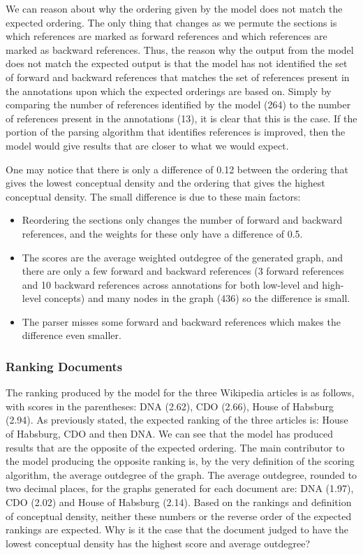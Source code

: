 \documentclass[12pt]{article}
\theoremstyle{grammarstyle}
\begin{document}
We can reason about why the ordering given by the model does not match the expected ordering.
The only thing that changes as we permute the sections is which references are marked as forward references and which references are marked as backward references.
Thus, the reason why the output from the model does not match the expected output is that the model has not identified the set of forward and backward references that matches the set of references present in the annotations upon which the expected orderings are based on.
Simply by comparing the number of references identified by the model (264) to the number of references present in the annotations (13), it is clear that this is the case.
If the portion of the parsing algorithm that identifies references is improved, then the model would give results that are closer to what we would expect.

One may notice that there is only a difference of 0.12 between the ordering that gives the lowest conceptual density and the ordering that gives the highest conceptual density.
The small difference is due to these main factors:
\begin{itemize}
    \item Reordering the sections only changes the number of forward and backward references, and the weights for these only have a difference of 0.5.
    \item The scores are the average weighted outdegree of the generated graph, and there are only a few forward and backward references (3 forward references and 10 backward references across annotations for both low-level and high-level concepts) and many nodes in the graph (436) so the difference is small.
    \item The parser misses some forward and backward references which makes the difference even smaller.
\end{itemize}

\subsubsection{Ranking Documents} \label{sec:ranking_documents_results}
The ranking produced by the model for the three Wikipedia articles \citep{wiki:habsburg, wiki:cdo, wiki:dna} is as follows, with scores in the parentheses: DNA (2.62), CDO (2.66), House of Habsburg (2.94).
As previously stated, the expected ranking of the three articles is:
House of Habsburg, CDO and then DNA.
We can see that the model has produced results that are the opposite of the expected ordering.
The main contributor to the model producing the opposite ranking is, by the very definition of the scoring algorithm, the average outdegree of the graph.
The average outdegree, rounded to two decimal places, for the graphs generated for each document are: DNA (1.97), CDO (2.02) and House of Habsburg (2.14).
Based on the rankings and definition of conceptual density, neither these numbers or the reverse order of the expected rankings are expected.
Why is it the case that the document judged to have the lowest conceptual density has the highest score and average outdegree?
\end{document}
